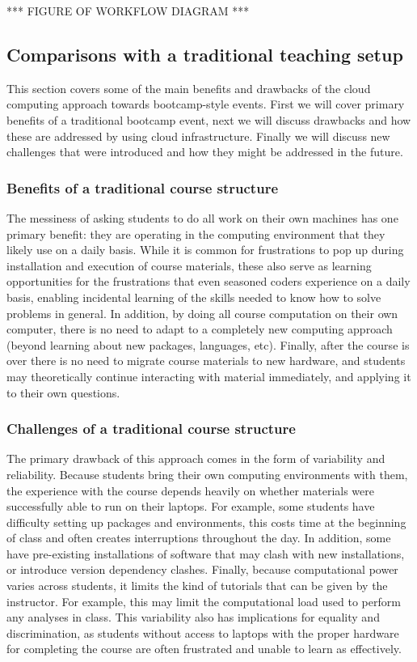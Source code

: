 *** FIGURE OF WORKFLOW DIAGRAM ***

\subsection{Comparisons with a traditional teaching setup}

This section covers some of the main benefits and drawbacks of the cloud
computing approach towards bootcamp-style events. First we will cover primary
benefits of a traditional bootcamp event, next we will discuss drawbacks and how
these are addressed by using cloud infrastructure. Finally we will discuss new
challenges that were introduced and how they might be addressed in the future.

\subsubsection{Benefits of a traditional course structure}

The messiness of asking students to do all work on their own machines has one
primary benefit: they are operating in the computing environment that they
likely use on a daily basis. While it is common for frustrations to pop up
during installation and execution of course materials, these also serve as
learning opportunities for the frustrations that even seasoned coders experience
on a daily basis, enabling incidental learning of the skills needed to know how
to solve problems in general. In addition, by doing all course computation on
their own computer, there is no need to adapt to a completely new computing
approach (beyond learning about new packages, languages, etc). Finally, after
the course is over there is no need to migrate course materials to new hardware,
and students may theoretically continue interacting with material immediately,
and applying it to their own questions.

\subsubsection{Challenges of a traditional course structure}

The primary drawback of this approach comes in the form of variability and
reliability. Because students bring their own computing environments with them,
the experience with the course depends heavily on whether materials were
successfully able to run on their laptops. For example, some students have
difficulty setting up packages and environments, this costs time at the
beginning of class and often creates interruptions throughout the day. In
addition, some have pre-existing installations of software that may clash with
new installations, or introduce version dependency clashes. Finally, because
computational power varies across students, it limits the kind of tutorials that
can be given by the instructor. For example, this may limit the computational
load used to perform any analyses in class. This variability also has
implications for equality and discrimination, as students without access to
laptops with the proper hardware for completing the course are often frustrated
and unable to learn as effectively.

